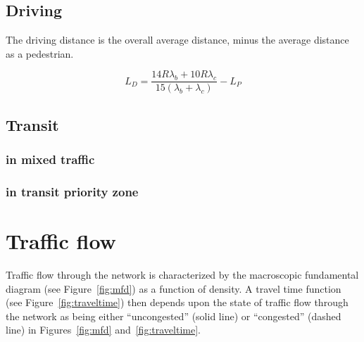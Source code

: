 \documentclass{article}
\begin{document}
\subsection{Driving}

The driving distance is the overall average distance, minus the average distance as a pedestrian. 

\begin{equation}
L_D = \frac{14R\lambda_b + 10R\lambda_c}{15(\lambda_b + \lambda_c)} - L_P
\end{equation}

\subsection{Transit}
\subsubsection{in mixed traffic}
\subsubsection{in transit priority zone}


\section{Traffic flow}
Traffic flow through the network is characterized by the macroscopic fundamental diagram (see Figure~\ref{fig:mfd}) as a function of density. A travel time function (see Figure~\ref{fig:traveltime}) then depends upon the state of traffic flow through the network as being either ``uncongested'' (solid line) or ``congested'' (dashed line) in Figures~\ref{fig:mfd} and~\ref{fig:traveltime}.
\end{document}
